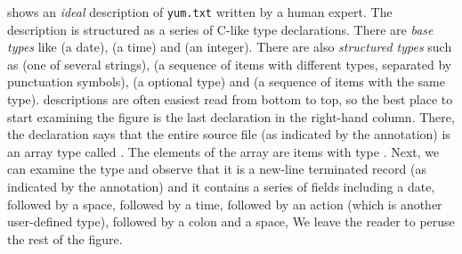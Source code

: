  shows an {\em ideal} \pads{} description of
{\tt yum.txt} written by a human expert.  The description is
structured as a series of C-like type declarations.  There
are {\em base types} like  (a date),
 (a time) and  (an integer).
There are also {\em structured types} such as
 (one of several strings), 
(a sequence of items with different types, 
separated by punctuation symbols),  
(a optional type) and  (a sequence of
items with the same type).  \pads{} descriptions
are often easiest read from bottom to top,
so the best place to start examining the figure
is the last declaration in the right-hand column.
There, the declaration says that the entire
source file (as indicated by the  
annotation) is an array type called .
The elements of the array are items with
type .  Next, we can examine
the type  and observe that it
is a new-line terminated 
record (as indicated by the 
annotation) and it contains a series of fields
including a date, followed by a space, followed
by a time, followed by an action (which is another
user-defined type), followed by a colon and a
space, \etc{} We leave the reader to peruse the
rest of the figure.

